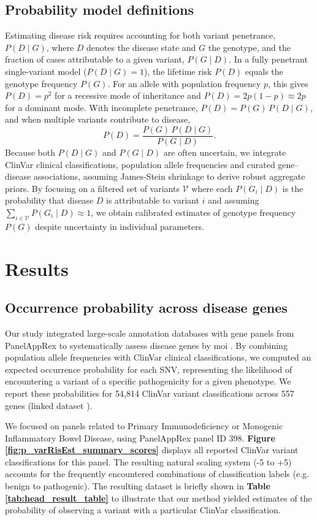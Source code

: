 \subsection{Probability model definitions}
Estimating disease risk requires accounting for both variant penetrance, $P(D\mid G)$, where $D$ denotes the disease state and $G$ the genotype, and the fraction of cases attributable to a given variant, $P(G\mid D)$. In a fully penetrant single-variant model ($P(D\mid G)=1$), the lifetime risk $P(D)$ equals the genotype frequency $P(G)$. For an allele with population frequency $p$, this gives $P(D)=p^2$ for a recessive mode of inheritance and $P(D)=2p(1-p)\approx2p$ for a dominant mode. With incomplete penetrance, $P(D)=P(G)\,P(D\mid G)$, and when multiple variants contribute to disease,  
\[
P(D)=\frac{P(G)\,P(D\mid G)}{P(G\mid D)}.
\]
Because both $P(D\mid G)$ and $P(G\mid D)$ are often uncertain, we integrate ClinVar clinical classifications, population allele frequencies and curated gene–disease associations, assuming James-Stein shrinkage to derive robust aggregate priors. By focusing on a filtered set of variants $\mathcal{V}$ where each $P(G_i\mid D)$ is the probability that disease $D$ is attributable to variant $i$ and assuming $\sum_{i\in\mathcal{V}}P(G_i\mid D)\approx1$, we obtain calibrated estimates of genotype frequency $P(G)$ despite uncertainty in individual parameters. 


\clearpage
\section{Results}
\subsection{Occurrence probability across disease genes}
\label{sec:pro_obs}
Our study integrated large-scale annotation databases with gene panels from PanelAppRex to systematically assess disease genes by \ac{moi} 
\cite{lawless_panelapprex_2025}. 
By combining population allele frequencies with ClinVar clinical classifications, we computed an expected occurrence probability for each SNV, representing the likelihood of encountering a variant of a specific pathogenicity for a given phenotype. We report these probabilities for 54,814 ClinVar variant classifications across 557 genes (linked dataset \cite{lawless_2025_15111584}).

We focused on panels related to Primary Immunodeficiency or Monogenic Inflammatory Bowel Disease, using PanelAppRex panel ID 398.
\textbf{Figure \ref{fig:p_varRisEst_summary_scores}} displays all reported ClinVar  variant classifications for this panel. The resulting natural scaling system (-5 to +5) accounts for the frequently encountered combinations of classification labels (e.g. benign to pathogenic).
The resulting dataset \cite{lawless_2025_15111584} is briefly shown in \textbf{Table \ref{tab:head_result_table}} to illustrate that our method yielded estimates of the probability of observing a variant with a particular ClinVar classification. 

